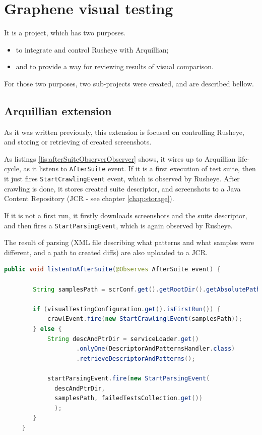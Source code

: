 \documentclass[11pt,oneside,final]{fithesis2}
\begin{document}
\section{Graphene visual testing}
    It is a project, which has two purposes.
    \begin{itemize}
     \item to integrate and control Rusheye with Arquillian;
     \item and to provide a way for reviewing results of visual comparison.
    \end{itemize}

    For those two purposes, two sub-projects were created, and are described bellow.
    
    \subsection{Arquillian extension}
    \label{sec:arqExt}
    As it was written previously, this extension is focused on controlling Rusheye, and storing or retrieving of created screenshots.
    
    As listings \ref{lis:afterSuiteObserverObserver} shows, it wires up to Arquillian life-cycle, as it listens to \texttt{AfterSuite} event. 
    If it is a first execution of test suite, then it just fires \texttt{StartCrawlingEvent} event, which is observed by Rusheye. 
    After crawling is done, it stores created suite descriptor, and screenshots to a Java Content Repository 
    (JCR - see chapter \ref{chap:storage}).
    
    If it is not a first run, it firstly downloads screenshots and the suite descriptor, and then fires a \texttt{StartParsingEvent}, 
    which is again observed by Rusheye.
    
    The result of parsing (XML file describing what patterns and what samples were different, and a path to created diffs) are also uploaded
    to a JCR.
    
    \begin{lstlisting}[caption=AfterSuite observer to controll Rusheye,label=lis:afterSuiteObserverObserver,language=java]
     public void listenToAfterSuite(@Observes AfterSuite event) {
        
        String samplesPath = scrConf.get().getRootDir().getAbsolutePath();
        
        if (visualTestingConfiguration.get().isFirstRun()) {
            crawlEvent.fire(new StartCrawlinglEvent(samplesPath));
        } else {
            String descAndPtrDir = serviceLoader.get()
                    .onlyOne(DescriptorAndPatternsHandler.class)
                    .retrieveDescriptorAndPatterns();
            
            startParsingEvent.fire(new StartParsingEvent(
		      descAndPtrDir,
		      samplesPath, failedTestsCollection.get())
		      );
        }
     }
    \end{lstlisting}
    
\end{document}
